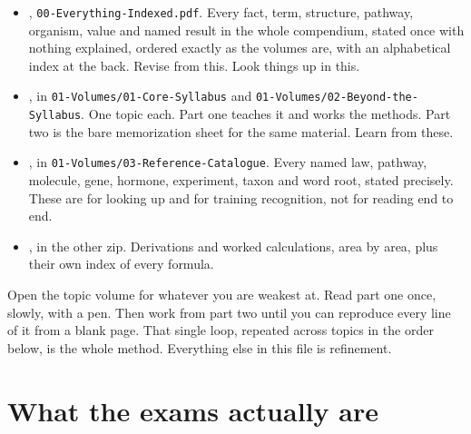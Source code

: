 \begin{keybox}[title={The four kinds of file}]
\begin{itemize}
\item {}, \texttt{00-Everything-Indexed.pdf}. Every fact,
      term, structure, pathway, organism, value and named result in the whole
      compendium, stated once with nothing explained, ordered exactly as the volumes
      are, with an alphabetical index at the back. Revise from this. Look things up in
      this.
\item {}, in \texttt{01-Volumes/01-Core-Syllabus} and
      \texttt{01-Volumes/02-Beyond-the-Syllabus}. One topic each. Part one teaches it
      and works the methods. Part two is the bare memorization sheet for the same
      material. Learn from these.
\item {}, in \texttt{01-Volumes/03-Reference-Catalogue}. Every named
      law, pathway, molecule, gene, hormone, experiment, taxon and word root, stated
      precisely. These are for looking up and for training recognition, not for reading
      end to end.
\item {}, in the other zip. Derivations and worked calculations,
      area by area, plus their own index of every formula.
\end{itemize}
\end{keybox}

\begin{tipbox}[title={If you only do one thing}]
Open the topic volume for whatever you are weakest at. Read part one once, slowly, with
a pen. Then work from part two until you can reproduce every line of it from a blank
page. That single loop, repeated across topics in the order below, is the whole method.
Everything else in this file is refinement.
\end{tipbox}

\section{What the exams actually are}

